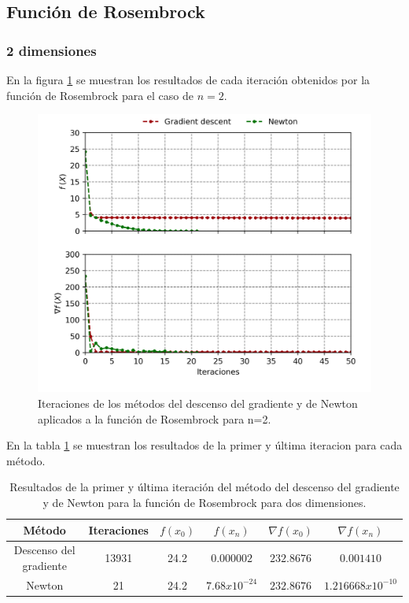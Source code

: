 
\subsection{Función de Rosembrock}

\subsubsection{2 dimensiones}

En la figura \ref{fig:rosembrock_2} se muestran los resultados de cada iteración obtenidos por la función de Rosembrock para el caso de $n=2$.

\begin{figure}[H]
    \centering
    \includegraphics[width=12cm]{Graphics/Problema_2/rosembrock_2_predefined.png}
    \caption{Iteraciones de los métodos del descenso del gradiente y de Newton aplicados a la función de Rosembrock para n=2.}
    \label{fig:rosembrock_2}
\end{figure}

En la tabla \ref{table:rosembrock_2} se muestran los resultados de la primer y última iteracion para cada método.

\begin{table}[H]
    \centering
    \begin{tabular}{cccccc} \hline
        Método                 & Iteraciones & $f(x_0)$ & $f(x_n)$        & $\nabla f(x_0)$ & $\nabla f(x_n) $    \\ \hline
        Descenso del gradiente & 13931       & 24.2     & $0.000002$      & $232.8676$      & $0.001410$          \\
        Newton                 & 21          & 24.2     & $7.68x10^{-24}$ & $232.8676$      & $1.216668x10^{-10}$ \\ \hline
    \end{tabular}
    \caption{Resultados de la primer y última iteración del método del descenso del gradiente y de Newton para la función de Rosembrock para dos dimensiones.}
    \label{table:rosembrock_2}
\end{table}

